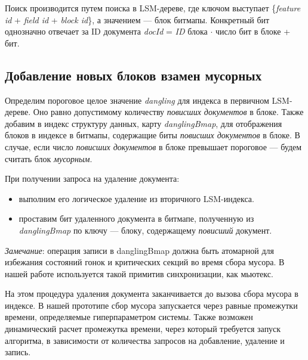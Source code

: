 Поиск производится путем поиска в LSM-дереве, где ключом выступает
\{\textit{feature id} + \textit{field id} + \textit{block id}\}, а значением — блок битмапы.
Конкретный бит однозначно отвечает за ID документа \textit{docId} = \textit{ID} блока
$\cdot$ число бит в блоке + бит.

\subsection{Добавление новых блоков взамен мусорных}

Определим пороговое целое значение \textit{dangling} для индекса в первичном
LSM-дереве. Оно равно допустимому количеству \textit{повисших документов} в
блоке. Также добавим в индекс структуру данных, карту \textit{danglingBmap}, для
отображения блоков в индексе в битмапы, содержащие биты \textit{повисших
документов} в блоке. В случае, если число \textit{повисших документов} в блоке
превышает пороговое — будем считать блок \textit{мусорным}.

При получении запроса на удаление документа:
\begin{itemize}
    \item выполним его логическое удаление из вторичного LSM-индекса.
    \item проставим бит удаленного документа в битмапе, полученную из
    \textit{danglingBmap} по ключу — блоку, содержащему \textit{повисший} документ.
\end{itemize}

\textit{Замечание}: операция записи в danglingBmap должна быть атомарной для 
избежания состояний гонок и критических секций во время сбора мусора. В нашей
работе используется такой примитив синхронизации, как мьютекс.

На этом процедура удаления документа заканчивается до вызова сбора мусора в индексе.
В нашей прототипе сбор мусора запускается через равные промежутки времени, определяемые 
гиперпараметром системы. Также возможен динамический расчет промежутка времени,
через который требуется запуск алгоритма, в зависимости от количества запросов на
добавление, удаление и запись.

